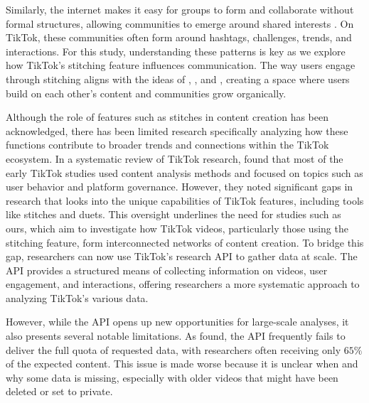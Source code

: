 Similarly, the internet makes it easy for groups to form and collaborate without formal structures, allowing communities to emerge around shared interests \citep{shirky2008here}. On TikTok, these communities often form around hashtags, challenges, trends, and interactions. For this study, understanding these patterns is key as we explore how TikTok’s stitching feature influences communication. The way users engage through stitching aligns with the ideas of \cite{jenkins2015participatory}, \cite{bruns2008blogs}, and \cite{shirky2008here}, creating a space where users build on each other’s content and communities grow organically.

Although the role of features such as stitches in content creation has been acknowledged, there has been limited research specifically analyzing how these functions contribute to broader trends and connections within the TikTok ecosystem. In a systematic review of TikTok research, \cite{tiktok_review} found that most of the early TikTok studies used content analysis methods and focused on topics such as user behavior and platform governance. However, they noted significant gaps in research that looks into the unique capabilities of TikTok features, including tools like stitches and duets. This oversight underlines the need for studies such as ours, which aim to investigate how TikTok videos, particularly those using the stitching feature, form interconnected networks of content creation. To bridge this gap, researchers can now use TikTok’s research API to gather data at scale. The API provides a structured means of collecting information on videos, user engagement, and interactions, offering researchers a more systematic approach to analyzing TikTok’s various data. 

However, while the API opens up new opportunities for large-scale analyses, it also presents several notable limitations. As \cite{corso2024we} found, the API frequently fails to deliver the full quota of requested data, with researchers often receiving only $65\%$ of the expected content. This issue is made worse because it is unclear when and why some data is missing, especially with older videos that might have been deleted or set to private. 


